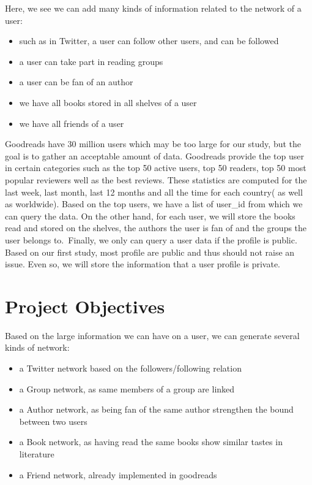 \documentclass[12pt]{article}
\begin{document}
Here, we see we can add many kinds of information related to the network of a user:
\begin{itemize}
\item such as in Twitter, a user can follow other users, and can be followed
\item a user can take part in reading groups
\item a user can be fan of an author
\item we have all books stored in all shelves of a user
\item we have all friends of a user
\end{itemize}

Goodreads have 30 million users which may be too large for our study, but the goal is to gather an acceptable amount of data. Goodreads provide the top user in certain categories such as the top 50 active users, top 50 readers, top 50 most popular reviewers well as the best reviews. These statistics are computed for the last week, last month, last 12 months and all the time for each country( as well as worldwide).
Based on the top users, we have a list of user\_id from which we can query the data. On the other hand, for each user, we will store the books read and stored on the shelves, the authors the user is fan of and the groups the user belongs to.\
Finally, we only can query a user data if the profile is public. Based on our first study, most profile are public and thus should not raise an issue. Even so, we will store the information that a user profile is private.


\section{Project Objectives}

Based on the large information we can have on a user, we can generate several kinds of network:
\begin{itemize}
\item a Twitter network based on the followers/following relation
\item a Group network, as same members of a group are linked
\item a Author network, as being fan of the same author strengthen the bound between two users
\item a Book network, as having read the same books show similar tastes in literature
\item a Friend network, already implemented in goodreads
\end{itemize}
\end{document}
